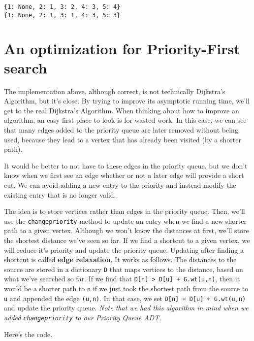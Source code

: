 \begin{Verbatim}
{1: None, 2: 1, 3: 2, 4: 3, 5: 4}
{1: None, 2: 1, 3: 1, 4: 3, 5: 3}

\end{Verbatim}

\section{An optimization for Priority-First search}


The implementation above, although correct, is not technically Dijkstra's Algorithm, but it's close.
By trying to improve its asymptotic running time, we'll get to the real Dijkstra's Algorithm.
When thinking about how to improve an algorithm, an easy first place to look is for wasted work.
In this case, we can see that many edges added to the priority queue are later removed without being used, because they lead to a vertex that has already been visited (by a shorter path).


It would be better to not have to these edges in the priority queue, but we don't know when we first see an edge whether or not a later edge will provide a short cut.
We can avoid adding a new entry to the priority and instead modify the existing entry that is no longer valid.


The idea is to store vertices rather than edges in the priority queue.
Then, we'll use the \texttt{changepriority} method to update an entry when we find a new shorter path to a given vertex.
Although we won't know the distances at first, we'll store the shortest distance we've seen so far.
If we find a shortcut to a given vertex, we will reduce it's priority and update the priority queue.
Updating after finding a shortcut is called \textbf{edge relaxation}.
It works as follows.
The distances to the source are stored in a dictionary \texttt{D} that maps vertices to the distance, based on what we've searched so far.
If we find that \texttt{D[n] > D[u] + G.wt(u,n)}, then it would be a shorter path to \texttt{n} if we just took the shortest path from the source to \texttt{u} and appended the edge \texttt{(u,n)}.  In that case, we set \texttt{D[n] = D[u] + G.wt(u,n)} and update the priority queue.
\emph{Note that we had this algorithm in mind when we added \texttt{changepriority} to our Priority Queue ADT.}


Here's the code.

